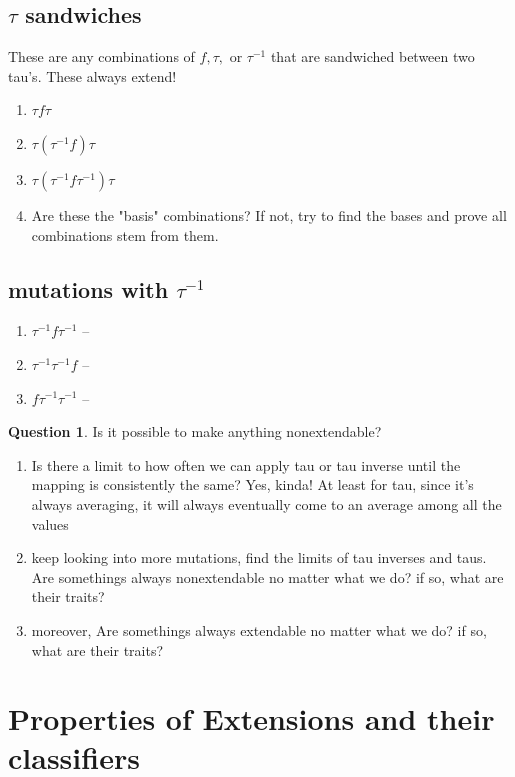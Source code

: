 \documentclass[11pt]{amsart}
\theoremstyle{definition}
\newtheorem{question}[thm]{Question}
\begin{document}
\subsection{$\tau$ sandwiches}
These are any combinations of \(f,\tau, \text{ or } \tau^{-1}\) that are sandwiched between two tau's. These always extend!
\begin{enumerate}
    \item \(\tau f \tau\)
    \item \(\tau (\tau^{-1} f) \tau\)
    \item \(\tau (\tau^{-1} f \tau^{-1})\tau\)
    \item Are these the "basis" combinations? If not, try to find the bases and prove all combinations stem from them.
\end{enumerate}

\subsection{mutations with $\tau^{-1}$}
\begin{enumerate}
    \item $\tau^{-1}f\tau^{-1}$ -- 
    \item $\tau^{-1}\tau^{-1}f$ -- 
    \item $f\tau^{-1}\tau^{-1}$ -- 
\end{enumerate}

\begin{question}
    Is it possible to make anything nonextendable?
\end{question}

\begin{enumerate}
    \item Is there a limit to how often we can apply tau or tau inverse until the mapping is consistently the same? Yes, kinda! At least for tau, since it's always averaging, it will always eventually come to an average among all the values
    \item keep looking into more mutations, find the limits of tau inverses and taus. Are somethings always nonextendable no matter what we do? if so, what are their traits?
    \item moreover, Are somethings always extendable no matter what we do? if so, what are their traits?
\end{enumerate}

\section{Properties of Extensions and their classifiers}
\end{document}

